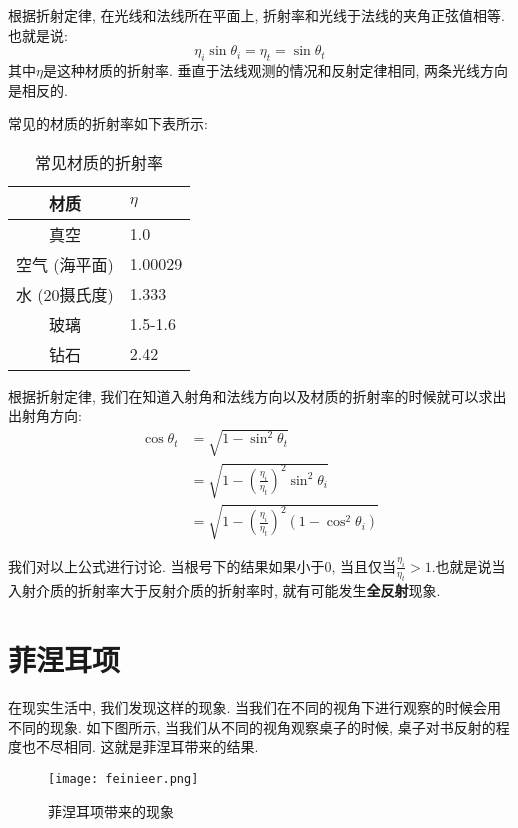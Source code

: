 \documentclass[openany]{progbookcn}
\begin{document}
根据折射定律, 在光线和法线所在平面上, 折射率和光线于法线的夹角正弦值相等. 也就是说: 
\begin{equation}
	\eta_i\sin\theta_i = \eta_t=\sin\theta_t
\end{equation}
其中$\eta$是这种材质的折射率. 垂直于法线观测的情况和反射定律相同, 两条光线方向是相反的. 

常见的材质的折射率如下表所示: 

\begin{table}[H]
	\centering
	\begin{tabular}{cl}
		\hline
		材质       & $\eta$  \\ \hline
		真空       & 1.0     \\
		空气 (海平面)   & 1.00029 \\
		水 (20摄氏度)  & 1.333   \\
		玻璃       & 1.5-1.6 \\
		钻石       & 2.42  \\ \hline
	\end{tabular}
	\caption{常见材质的折射率}
\end{table}

根据折射定律, 我们在知道入射角和法线方向以及材质的折射率的时候就可以求出出射角方向: 
\begin{equation}
	\begin{split}
		\cos\theta_t&=\sqrt{1-\sin^2\theta_t}\\
		&=\sqrt{1-(\frac{\eta_i}{\eta_t})^2\sin^2\theta_i}\\
		&=\sqrt{1-(\frac{\eta_i}{\eta_t})^2(1-\cos^2\theta_i)}
	\end{split}
\end{equation}

我们对以上公式进行讨论. 当根号下的结果如果小于0, 当且仅当$\frac{\eta_i}{\eta_t}>1$.也就是说当入射介质的折射率大于反射介质的折射率时, 就有可能发生\textbf{全反射}现象. 

\section{菲涅耳项}

在现实生活中, 我们发现这样的现象. 当我们在不同的视角下进行观察的时候会用不同的现象. 如下图所示, 当我们从不同的视角观察桌子的时候, 桌子对书反射的程度也不尽相同. 这就是菲涅耳带来的结果. 

\begin{figure}[H]
	\centering
	\texttt{[image: feinieer.png]}
	\caption{菲涅耳项带来的现象}
	\label{fig:fne}
\end{figure}
\end{document}
